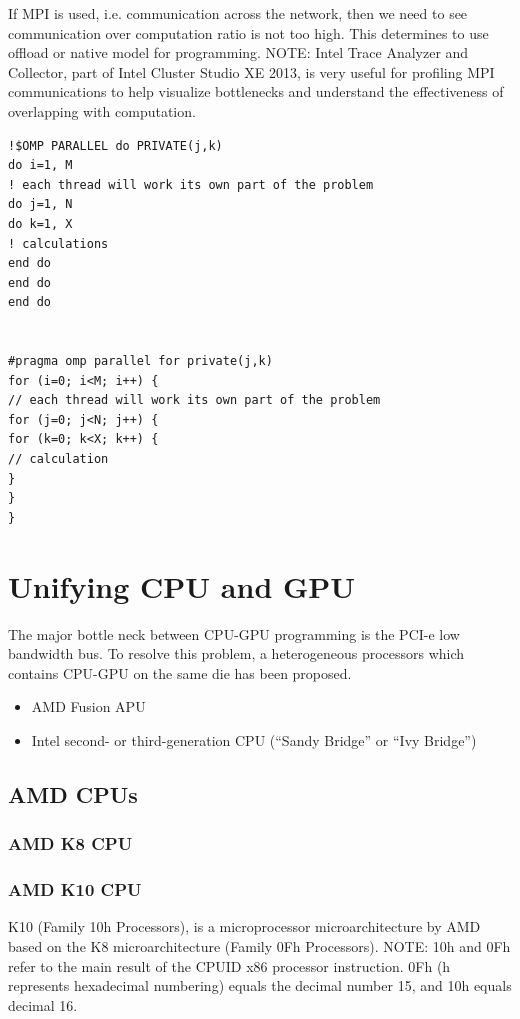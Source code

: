 If MPI is used, i.e. communication across the network, then we need to see
communication over computation ratio is not too high. This determines to use
offload or native  model for programming. NOTE: Intel Trace Analyzer and
Collector, part of Intel Cluster Studio XE 2013, is very useful for profiling
MPI communications to help visualize bottlenecks and understand the
effectiveness of overlapping with computation.


\begin{verbatim}
!$OMP PARALLEL do PRIVATE(j,k)
do i=1, M
! each thread will work its own part of the problem
do j=1, N
do k=1, X
! calculations
end do
end do
end do


#pragma omp parallel for private(j,k)
for (i=0; i<M; i++) {
// each thread will work its own part of the problem
for (j=0; j<N; j++) {
for (k=0; k<X; k++) {
// calculation
}
}
}
\end{verbatim}


\chapter{Unifying CPU and GPU}
\label{chap:unifying-cpu-gpu}

The major bottle neck between CPU-GPU programming is the PCI-e low bandwidth
bus. To resolve this problem, a heterogeneous processors which contains CPU-GPU
on the same die has been proposed.
\begin{itemize}
  \item AMD Fusion APU
  \item Intel second- or third-generation CPU (``Sandy Bridge'' or ``Ivy Bridge'')
\end{itemize}

\section{AMD CPUs}

\subsection{AMD K8 CPU}
\label{sec:K8-CPU}

\subsection{AMD K10 CPU}
\label{sec:K10-CPU-AMD}

K10 (Family 10h Processors), is a microprocessor microarchitecture by AMD based
on the K8 microarchitecture (Family 0Fh Processors).
NOTE: 10h and 0Fh refer to the main result of the CPUID x86 processor
instruction. 0Fh (h represents hexadecimal numbering) equals the decimal number
15, and 10h equals decimal 16.

